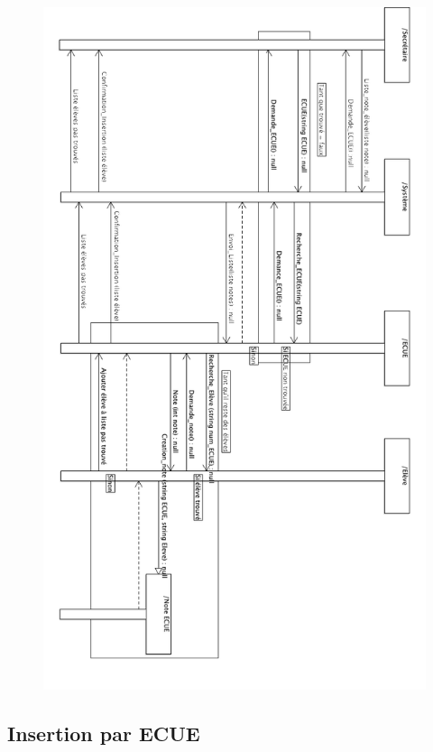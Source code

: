 \documentclass[letter, 11pt] {article}
\begin{document}
		\begin{figure}[htbp]
				\includegraphics[scale = 0.5]{../Diagrammes_sequence/Diagramme_sequence_insertion_promo.png}
		\end{figure}
		
		\newpage
				\subsection{Insertion par ECUE}
		
\end{document}
